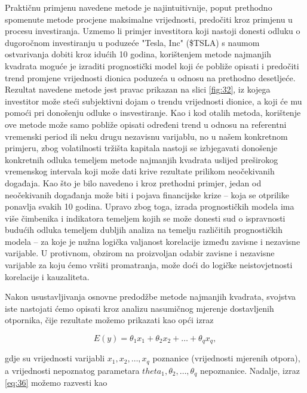 \documentclass[a4paper,12pt,oneside]{memoir}
\begin{document}
                Praktičnu primjenu navedene metode je najintuitivnije, poput prethodno spomenute metode procjene maksimalne vrijednosti, predočiti kroz primjenu u procesu investiranja. Uzmemo li primjer investitora koji nastoji donesti odluku o dugoročnom investiranju u poduzeće "Tesla, Inc" (\$TSLA) s naumom ostvarivanja dobiti kroz idućih 10 godina, korištenjem metode najmanjih kvadrata moguće je izraditi prognostički model koji će pobliže opisati i predočiti trend promjene vrijednosti dionica poduzeća u odnosu na prethodno desetljeće. Rezultat navedene metode jest pravac prikazan na slici \ref{fig:32}, iz kojega investitor može steći subjektivni dojam o trendu vrijednosti dionice, a koji će mu pomoći pri donošenju odluke o insvestiranje. Kao i kod otalih metoda, korištenje ove metode može samo pobliže opisati određeni trend u odnosu na referentni vremenski period ili neku drugu nezavisnu varijablu, no u našem konkretnom primjeru, zbog volatilnosti tržišta kapitala nastoji se izbjegavati donošenje konkretnih odluka temeljem metode najmanjih kvadrata uslijed preširokog vremenskog intervala koji može dati krive rezultate prilikom neočekivanih događaja. Kao što je bilo navedeno i kroz prethodni primjer, jedan od neočekivanih događanja može biti i pojava financijske krize -- koja se otprilike ponavlja svakih 10 godina. Upravo zbog toga, izrada prognostičkih modela ima više čimbenika i indikatora temeljem kojih se može donesti sud o ispravnosti budućih odluka temeljem dubljih analiza na temelju različitih prognostičkih modela -- za koje je nužna logička valjanost korelacije između zavisne i nezavisne varijable. U protivnom, obzirom na proizvoljan odabir zavisne i nezavisne varijable za koju ćemo vršiti promatranja, može doći do logičke neistovjetnosti korelacije i kauzaliteta.

                Nakon usustavljivanja osnovne predodžbe metode najmanjih kvadrata, svojstva iste nastojati ćemo opisati kroz analizu nasumičnog mjerenje dostavljenih otpornika, čije rezultate možemo prikazati kao opći izraz

                \begin{equation}
                    E(y)=\theta_1x_1+\theta_2x_2+\ldots+\theta_qx_q,
                    \label{eq:36}
                \end{equation}

                gdje su vrijednosti varijabli $x_1,x_2,\ldots,x_q$ poznanice (vrijednosti mjerenih otpora), a vrijednosti nepoznatog parametara $theta_1,\theta_2,\ldots,\theta_q$ nepoznanice. Nadalje, izraz \ref{eq:36} možemo razvesti kao
\end{document}
